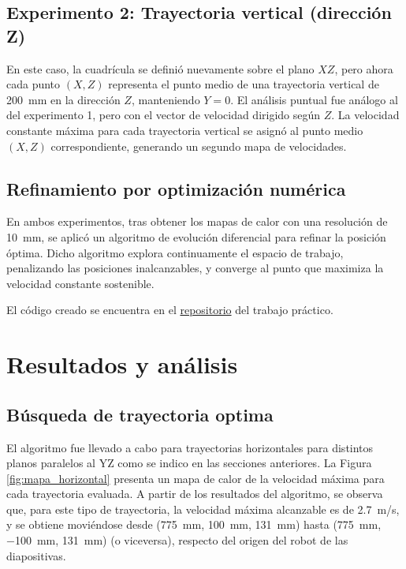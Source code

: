 \subsection{Experimento 2: Trayectoria vertical (dirección Z)}
En este caso, la cuadrícula se definió nuevamente sobre el plano $XZ$, pero ahora cada punto $(X,Z)$ representa el punto medio de una trayectoria vertical de \SI{200}{\mm} en la dirección $Z$, manteniendo $Y=0$. El análisis puntual fue análogo al del experimento 1, pero con el vector de velocidad dirigido según $Z$. La velocidad constante máxima para cada trayectoria vertical se asignó al punto medio $(X,Z)$ correspondiente, generando un segundo mapa de velocidades.

\subsection{Refinamiento por optimización numérica}
En ambos experimentos, tras obtener los mapas de calor con una resolución de \SI{10}{\mm}, se aplicó un algoritmo de evolución diferencial para refinar la posición óptima. Dicho algoritmo explora continuamente el espacio de trabajo, penalizando las posiciones inalcanzables, y converge al punto que maximiza la velocidad constante sostenible.


El código creado se encuentra en el \href{https://github.com/Icavicchioli/Robotica-Industrial-Tps/tree/1b1454d01ef875238b37204d2b72a497e9b86118/c%C3%B3digo%20manuel}{repositorio} del trabajo práctico.

\clearpage
\section{Resultados y análisis}

\subsection{Búsqueda de trayectoria optima}
El algoritmo fue llevado a cabo para trayectorias horizontales para distintos planos paralelos al YZ como se indico en las secciones anteriores. La Figura \ref{fig:mapa_horizontal} presenta un mapa de calor de la velocidad máxima para cada trayectoria evaluada. A partir de los resultados del algoritmo, se observa que, para este tipo de trayectoria, la velocidad máxima alcanzable es de \SI{2,7}{m/s}, y se obtiene moviéndose desde (\SI{775}{mm}, \SI{100}{mm}, \SI{131}{mm}) hasta (\SI{775}{mm}, \SI{-100}{mm}, \SI{131}{mm}) (o viceversa), respecto del origen del robot de las diapositivas.

